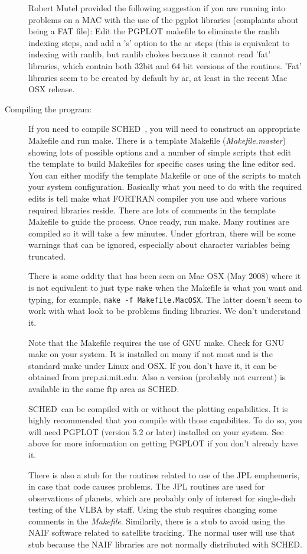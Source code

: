 \documentclass{report}
\newcommand{\sched}{{\sc SCHED}}
\newcommand{\schedb}{{\sc SCHED~}}
\begin{document}
\begin{description}
Robert Mutel provided the following suggestion if you are running into
problems on a MAC with the use of the pgplot libraries (complaints
about being a FAT file): Edit the PGPLOT makefile to eliminate the
ranlib indexing steps, and add a 's' option to the ar steps (this is
equivalent to indexing with ranlib, but ranlib chokes because it
cannot read 'fat' libraries, which contain both 32bit and 64 bit
versions of the routines. 'Fat' libraries seem to be created by
default by ar, at least in the recent Mac OSX release.

\item [Compiling the program:] If you need to compile \schedb, you
will need to construct an appropriate Makefile and run make.  There is
a template Makefile ({\sl Makefile.master}) showing lots of possible
options and a number of simple scripts that edit the template to build
Makefiles for specific cases using the line editor sed.  You can
either modify the template Makefile or one of the scripts to match
your system configuration.  Basically what you need to do with the
required edits is tell make what FORTRAN compiler you use and where
various required libraries reside.  There are lots of comments in the
template Makefile to guide the process.  Once ready, run make.  Many
routines are compiled so it will take a few minutes.  Under gfortran,
there will be some warnings that can be ignored, especially about
character variables being truncated.

There is some oddity that has been seen on Mac OSX (May 2008) where it
is not equivalent to just type {\tt make} when the Makefile is what
you want and typing, for example, {\tt make -f Makefile.MacOSX}.  The
latter doesn't seem to work with what look to be problems finding
libraries.  We don't understand it.

Note that the Makefile requires the use of GNU make.  Check for GNU
make on your system.  It is installed on many if not most and is the
standard make under Linux and OSX.  If you don't have it, it can be
obtained from prep.ai.mit.edu.  Also a version (probably not current)
is available in the same ftp area as \sched.

\schedb can be compiled with or without the plotting capabilities.  It
is highly recommended that you compile with those capabilites.  To do
so, you will need {\sc PGPLOT} (version 5.2 or later) installed on
your system.  See above for more information on getting {\sc PGPLOT}
if you don't already have it.

There is also a stub for the routines related to use of the JPL
emphemeris, in case that code causes problems.  The JPL routines are
used for observations of planets, which are probably only of interest
for single-dish testing of the VLBA by staff.  Using the stub requires
changing some comments in the {\sl Makefile}.  Similarily, there is
a stub to avoid using the NAIF software related to satellite tracking.
The normal user will use that stub because the NAIF libraries are not
normally distributed with \sched.


\end{description}
\end{document}
